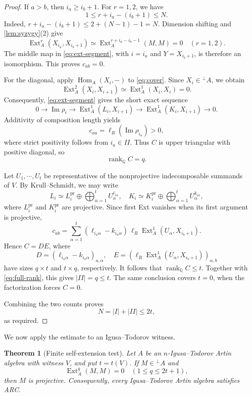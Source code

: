 \documentclass[a4paper,reqno]{amsart}
\numberwithin{equation}{section}
\newtheorem{thm}{Theorem}[section]
\theoremstyle{definition}
\DeclareMathOperator{\Ext}{Ext}
\DeclareMathOperator{\Hom}{Hom}
\DeclareMathOperator{\rank}{rank}
\DeclareMathOperator{\im}{Im}
\newcommand{\perpA}{{}^{\perp}A}
\newcommand{\len}{\ell_R}
\begin{document}
\begin{proof}
If $a>b$, then $i_a\geq i_b+1$. For $r=1,2$, we have
\[
1\leq r+i_a-(i_b+1)\leq N.
\]
Indeed, $r+i_a-(i_b+1)\leq2+(N-1)-1=N$. Dimension shifting and \cref{lem:syzygy}(2) give
\[
\Ext_A^r(X_{i_a},X_{i_b+1})
\simeq\Ext_A^{r+i_a-i_b-1}(M,M)=0
\quad(r=1,2).
\]
The middle map in \eqref{eq:ext-segment}, with $i=i_a$ and $Y=X_{i_b+1}$, is therefore an isomorphism. This proves $c_{ab}=0$.

For the diagonal, apply $\Hom_A(X_i,-)$ to \eqref{eq:cover}. Since $X_i\in\perpA$, we obtain
\[
\Ext_A^2(X_i,X_{i+1})\simeq\Ext_A^1(X_i,X_i)=0.
\]
Consequently, \eqref{eq:ext-segment} gives the short exact sequence
\[
0\longrightarrow\im\rho_i\longrightarrow\Ext_A^1(L_i,X_{i+1})
\longrightarrow\Ext_A^1(K_i,X_{i+1})\longrightarrow0.
\]
Additivity of composition length yields
\[
c_{aa}=\len(\im\rho_{i_a})>0,
\]
where strict positivity follows from $i_a\in II$. Thus $C$ is upper triangular with positive diagonal, so
\begin{equation}\label{eq:full-rank}
\rank_{\mathbb Q}C=q.
\end{equation}

Let $U_1,\cdots,U_t$ be representatives of the nonprojective indecomposable summands of $V$. By Krull--Schmidt, we may write
\[
L_i\simeq L_i^{\mathrm{pr}}\oplus\bigoplus_{\alpha=1}^tU_\alpha^{\ell_{i\alpha}},
\quad
K_i\simeq K_i^{\mathrm{pr}}\oplus\bigoplus_{\alpha=1}^tU_\alpha^{k_{i\alpha}},
\]
where $L_i^{\mathrm{pr}}$ and $K_i^{\mathrm{pr}}$ are projective. Since first Ext vanishes when its first argument is projective,
\[
c_{ab}=\sum_{\alpha=1}^t
(\ell_{i_a\alpha}-k_{i_a\alpha})\,
\len\Ext_A^1(U_\alpha,X_{i_b+1}).
\]
Hence $C=DE$, where
\[
D=(\ell_{i_a\alpha}-k_{i_a\alpha})_{a,\alpha},
\quad
E=(\len\Ext_A^1(U_\alpha,X_{i_b+1}))_{\alpha,b}
\]
have sizes $q\times t$ and $t\times q$, respectively. It follows that $\rank_{\mathbb Q}C\leq t$. Together with \eqref{eq:full-rank}, this gives $|II|=q\leq t$. The same conclusion covers $t=0$, when the factorization forces $C=0$.

Combining the two counts proves
\[
N=|I|+|II|\leq2t,
\]
as required.
\end{proof}

We now apply the estimate to an Igusa--Todorov witness.

\begin{thm}[Finite self-extension test]\label{thm:finite-test}
Let $A$ be an $n$-Igusa--Todorov Artin algebra with witness $V$, and put $t=t(V)$. If $M\in\perpA$ and
\[
\Ext_A^q(M,M)=0\quad(1\leq q\leq 2t+1),
\]
then $M$ is projective. Consequently, every Igusa--Todorov Artin algebra satisfies ARC.
\end{thm}
\end{document}
